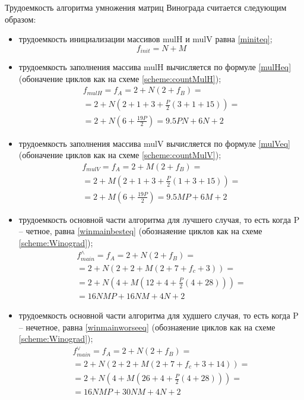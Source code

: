 Трудоемкость алгоритма умножения матриц Винограда считается следующим образом:
\begin{itemize}[left=\parindent]
    \item трудоемкость инициализации массивов mulH и mulV равна \ref{miniteq};
        \begin{equation}\label{miniteq}
            f_{init} = N + M
        \end{equation}

    \item трудоемкость заполнения массива mulH вычисляется по формуле
        \ref{mulHeq} (обоначение циклов как на схеме \ref{scheme:countMulH});
        \begin{multline}\label{mulHeq}
            f_{mulH} = f_A = 2 + N(2 + f_B) = \\ = 2 + N(2 +
                       1 + 3 + \frac{P}{2}(3 + 1 + 15)) = \\ = 2 +
                       N(6 + \frac{19P}{2}) = 9.5PN + 6N + 2
        \end{multline}

    \item трудоемкость заполнения массива mulV вычисляется по формуле
        \ref{mulVeq} (обоначение циклов как на схеме \ref{scheme:countMulV});
        \begin{multline}\label{mulVeq}
            f_{mulV} = f_A = 2 + M(2 + f_B) = \\ = 2 +
            M(2 + 1 + 3 + \frac{P}{2}(1 + 3 + 15)) = \\ = 2 + M(6 +
            \frac{19P}{2}) = 9.5MP + 6M + 2
        \end{multline}

    \item трудоемкость основной части алгоритма для лучшего случая, то есть
        когда P -- четное, равна \ref{winmainbesteq} (обознаяение циклов как на
        схеме \ref{scheme:Winograd});
        \begin{multline}\label{winmainbesteq}
            f_{main}^{\wedge} = f_A = 2 + N(2 + f_B) = \\ =  2 + N(2 + 2 + M(2
            + 7 + f_c + 3)) = \\ = 2 + N(4 + M(12 + 4 + \frac{P}{2}(4 + 28))) =
            \\ = 16NMP + 16NM + 4N + 2
        \end{multline}

    \item трудоемкость основной части алгоритма для худшего случая, то есть
        когда P -- нечетное, равна \ref{winmainworseeq} (обознаяение циклов как
        на схеме \ref{scheme:Winograd});
        \begin{multline}\label{winmainworseeq}
            f_{main}^{\vee} = f_A = 2 + N(2 + f_B) = \\ =  2 + N(2 + 2 + M(2 +
            7 + f_c + 3 + 14)) = \\ = 2 + N(4 + M(26 + 4 + \frac{P}{2}(4 +
            28))) = \\ = 16NMP + 30NM + 4N + 2
        \end{multline}
\end{itemize}

